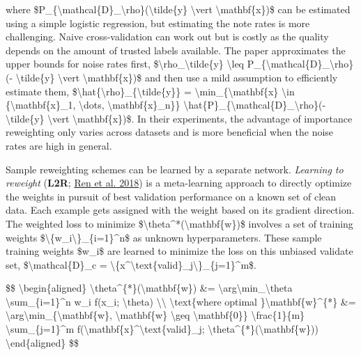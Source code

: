 where \$P\_\{\textbackslash mathcal\{D\}\_\textbackslash rho\}(\textbackslash tilde\{y\} \textbackslash vert \textbackslash mathbf\{x\})\$ can be estimated using a simple logistic regression, but estimating the note rates is more challenging. Naive cross-validation can work out but is costly as the quality depends on the amount of trusted labels available. The paper approximates the upper bounds for noise rates first, \$\textbackslash rho\_\textbackslash tilde\{y\} \textbackslash leq P\_\{\textbackslash mathcal\{D\}\_\textbackslash rho\}(- \textbackslash tilde\{y\} \textbackslash vert \textbackslash mathbf\{x\})\$ and then use a mild assumption to efficiently estimate them, \$\textbackslash hat\{\textbackslash rho\}\_\{\textbackslash tilde\{y\}\} = \textbackslash min\_\{\textbackslash mathbf\{x\} \textbackslash in \{\textbackslash mathbf\{x\}\_1, \textbackslash dots, \textbackslash mathbf\{x\}\_n\}\} \textbackslash hat\{P\}\_\{\textbackslash mathcal\{D\}\_\textbackslash rho\}(- \textbackslash tilde\{y\} \textbackslash vert \textbackslash mathbf\{x\})\$. In their experiments, the advantage of importance reweighting only varies across datasets and is more beneficial when the noise rates are high in general.

Sample reweighting schemes can be learned by a separate network. \emph{Learning to reweight} (\textbf{L2R}; \href{https://arxiv.org/abs/1803.09050}{Ren et al. 2018}) is a meta-learning approach to directly optimize the weights in pursuit of best validation performance on a known set of clean data. Each example gets assigned with the weight based on its gradient direction. The weighted loss to minimize \$\textbackslash theta\^{}*(\textbackslash mathbf\{w\})\$ involves a set of training weights \$\textbackslash\{w\_i\textbackslash\}\_\{i=1\}\^{}n\$ as unknown hyperparameters. These sample training weights \$w\_i\$ are learned to minimize the loss on this unbiased validate set, \$\textbackslash mathcal\{D\}\_c = \textbackslash\{x\^{}\textbackslash text\{valid\}\_j\textbackslash\}\_\{j=1\}\^{}m\$.

\$\$ \textbackslash begin\{aligned\} \textbackslash theta\^{}\{*\}(\textbackslash mathbf\{w\}) \&= \textbackslash arg\textbackslash min\_\textbackslash theta \textbackslash sum\_\{i=1\}\^{}n w\_i f(x\_i; \textbackslash theta) \textbackslash\textbackslash{} \textbackslash text\{where optimal \}\textbackslash mathbf\{w\}\^{}\{*\} \&= \textbackslash arg\textbackslash min\_\{\textbackslash mathbf\{w\}, \textbackslash mathbf\{w\} \textbackslash geq \textbackslash mathbf\{0\}\} \textbackslash frac\{1\}\{m\} \textbackslash sum\_\{j=1\}\^{}m f(\textbackslash mathbf\{x\}\^{}\textbackslash text\{valid\}\_j; \textbackslash theta\^{}\{*\}(\textbackslash mathbf\{w\})) \textbackslash end\{aligned\} \$\$

